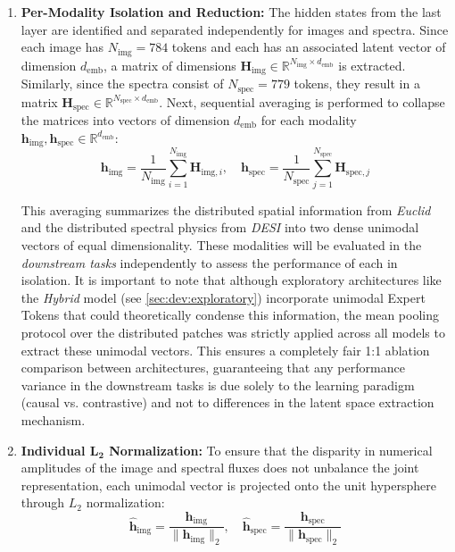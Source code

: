 \begin{enumerate}
    \item \textbf{Per-Modality Isolation and Reduction:}
    The hidden states from the last layer are identified and separated independently for images and spectra. Since each image has $N_{\text{img}} = 784$ tokens and each has an associated latent vector of dimension $d_{\text{emb}}$, a matrix of dimensions $\mathbf{H}_{\text{img}} \in \mathbb{R}^{N_{\text{img}} \times d_{\text{emb}}}$ is extracted. Similarly, since the spectra consist of $N_{\text{spec}} = 779$ tokens, they result in a matrix $\mathbf{H}_{\text{spec}} \in \mathbb{R}^{N_{\text{spec}} \times d_{\text{emb}}}$. Next, sequential averaging is performed to collapse the matrices into vectors of dimension $d_{\text{emb}}$ for each modality $\mathbf{h}_{\text{img}}, \mathbf{h}_{\text{spec}} \in \mathbb{R}^{d_{\text{emb}}}$:
    \begin{equation}
    \mathbf{h}_{\text{img}} = \frac{1}{N_{\text{img}}} \sum_{i=1}^{N_{\text{img}}} \mathbf{H}_{\text{img}, i}, \quad
    \mathbf{h}_{\text{spec}} = \frac{1}{N_{\text{spec}}} \sum_{j=1}^{N_{\text{spec}}} \mathbf{H}_{\text{spec}, j}
    \label{eq:mean_pooling}
    \end{equation}

    This averaging summarizes the distributed spatial information from \textit{Euclid} and the distributed spectral physics from \textit{\gls{DESI}} into two dense unimodal vectors of equal dimensionality. These modalities will be evaluated in the \textit{downstream tasks} independently to assess the performance of each in isolation. It is important to note that although exploratory architectures like the \textit{Hybrid} model (see \cref{sec:dev:exploratory}) incorporate unimodal Expert Tokens that could theoretically condense this information, the mean pooling protocol over the distributed patches was strictly applied across all models to extract these unimodal vectors. This ensures a completely fair 1:1 ablation comparison between architectures, guaranteeing that any performance variance in the downstream tasks is due solely to the learning paradigm (causal vs. contrastive) and not to differences in the latent space extraction mechanism.

    \item \textbf{Individual $\mathbf{L_2}$ Normalization:}
    To ensure that the disparity in numerical amplitudes of the image and spectral fluxes does not unbalance the joint representation, each unimodal vector is projected onto the unit hypersphere through $L_2$ normalization:
    \begin{equation}
    \mathbf{\hat{h}}_{\text{img}} = \frac{\mathbf{h}_{\text{img}}}{\|\mathbf{h}_{\text{img}}\|_2}, \quad \mathbf{\hat{h}}_{\text{spec}} = \frac{\mathbf{h}_{\text{spec}}}{\|\mathbf{h}_{\text{spec}}\|_2}
    \label{eq:norm_unimodal}
    \end{equation}


\end{enumerate}

